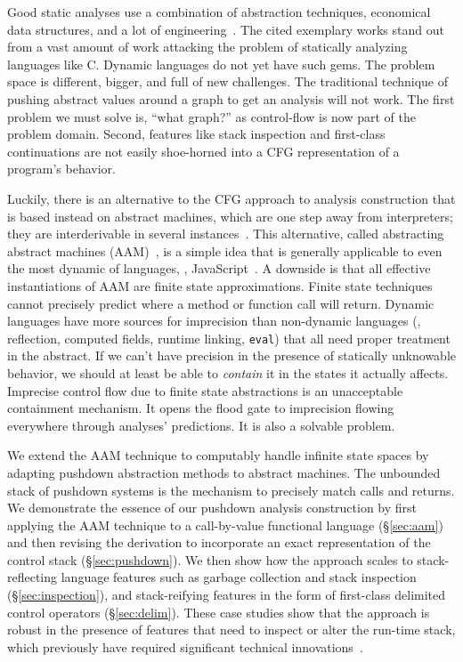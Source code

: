 Good static analyses use a combination of abstraction techniques, economical data structures, and a lot of engineering~\citep{dvanhorn:CousotEtAl-TASE07,ianjohnson:DBLP:journals/ipl/YiCKK07}.
%
The cited exemplary works stand out from a vast amount of work attacking the problem of statically analyzing languages like C.
%
Dynamic languages do not yet have such gems.
%
The problem space is different, bigger, and full of new challenges.
%
The traditional technique of pushing abstract values around a graph to get an analysis will not work.
%
The first problem we must solve is, ``what graph?'' as control-flow is now part of the problem domain.
%
Second, features like stack inspection and first-class continuations are not easily shoe-horned into a CFG representation of a program's behavior.
%

%
Luckily, there is an alternative to the CFG approach to analysis construction that is based instead on abstract machines, which are one step away from interpreters; they are interderivable in several instances~\citep{dvanhorn:Danvy:DSc}.
%
This alternative, called abstracting abstract machines
(AAM)~\citep{dvanhorn:VanHorn2012Systematic}, is a simple
idea that is generally applicable to even the most dynamic of
languages, \eg{},
JavaScript~\citep{ianjohnson:DBLP:journals/corr/KashyapDKWGSWH14}.
%
A downside is that all effective instantiations of AAM are finite state approximations.
%
Finite state techniques cannot precisely predict where a method or function call will return.
%
Dynamic languages have more sources for imprecision than non-dynamic languages (\eg{}, reflection, computed fields, runtime linking, {\tt eval}) that all need proper treatment in the abstract.
%
If we can't have precision in the presence of statically unknowable behavior, we should at least be able to \emph{contain} it in the states it actually affects.
%
Imprecise control flow due to finite state abstractions is an unacceptable containment mechanism.
%
It opens the flood gate to imprecision flowing everywhere through analyses' predictions.
%
It is also a solvable problem.
%

%
We extend the AAM technique to computably handle infinite state spaces by adapting pushdown abstraction methods to abstract machines.
%
The unbounded stack of pushdown systems is the mechanism to precisely match calls and returns.
%
We demonstrate the essence of our pushdown analysis construction by
first applying the AAM technique to a call-by-value functional
language (\S\ref{sec:aam}) and then revising the derivation to
incorporate an exact representation of the control stack
(\S\ref{sec:pushdown}).  We then show how the approach scales to
stack-reflecting language features such as garbage collection and
stack inspection (\S\ref{sec:inspection}), and stack-reifying features
in the form of first-class delimited control operators (\S\ref{sec:delim}).
%
These case studies show that the approach is robust in the presence of
features that need to inspect or alter the run-time stack, which
previously have required significant technical
innovations~\cite{dvanhorn:Vardoulakis2011Pushdown,ianjohnson:DBLP:journals/jfp/JohnsonSEMH14}.

